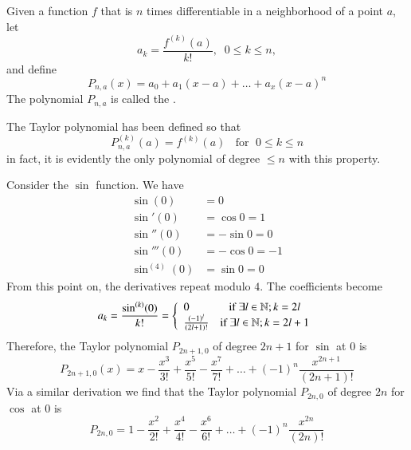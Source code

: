 \documentclass[12pt]{report}
\begin{document}
\begin{defn}{}{}
    Given a function $f$ that is $n$ times differentiable in a neighborhood of a point $a$, let \begin{equation*}
        a_k = \frac{f^{(k)}(a)}{k!},\;\;0\leq k \leq n,
    \end{equation*}
    and define \begin{equation*}{}{}
        P_{n,a}(x) = a_0 + a_1(x-a) + \hdots + a_x(x-a)^n
    \end{equation*}
    The polynomial $P_{n,a}$ is called the . 
\end{defn}

\begin{rmk}{}{}
    The Taylor polynomial has been defined so that \begin{equation*}{}{}
        P_{n,a}^{(k)}(a) = f^{(k)}(a)\;\;\text{ for }\;0\leq k \leq n
    \end{equation*}
    in fact, it is evidently the only polynomial of degree $\leq n$ with this property.
\end{rmk}

\begin{eg*}{}{}
    Consider the $\sin$ function. We have \begin{align*}
        \sin(0) &= 0 \\
        \sin'(0) &= \cos 0 = 1 \\
        \sin''(0) &= -\sin 0 = 0 \\
        \sin'''(0) &= -\cos 0 = -1 \\
        \sin^{(4)}(0) &= \sin 0 = 0
    \end{align*}
    From this point on, the derivatives repeat modulo $4$. The coefficients become \begin{equation*}
        a_k = \frac{\sin^{(k)}(0)}{k!} = \left\{\begin{array}{lc} 0 & \text{if } \exists l \in \mathbb N; k = 2l \\
            \frac{(-1)^{l}}{(2l+1)!} & \text{if } \exists l \in \mathbb N; k = 2l+1
        \end{array}\right.
    \end{equation*}
    Therefore, the Taylor polynomial $P_{2n+1,0}$ of degree $2n+1$ for $\sin$ at $0$ is \begin{equation*}
        P_{2n+1,0}(x) = x-\frac{x^3}{3!}+\frac{x^5}{5!} - \frac{x^7}{7!}+\hdots + (-1)^n\frac{x^{2n+1}}{(2n+1)!}
    \end{equation*}
    Via a similar derivation we find that the Taylor polynomial $P_{2n,0}$ of degree $2n$ for $\cos$ at $0$ is \begin{equation*}
        P_{2n,0} = 1 - \frac{x^2}{2!} + \frac{x^4}{4!} - \frac{x^6}{6!} + \hdots + (-1)^n\frac{x^{2n}}{(2n)!}
    \end{equation*}
\end{eg*}
\end{document}
